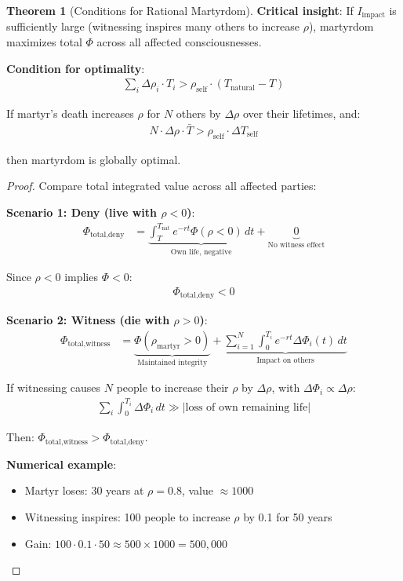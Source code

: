 \documentclass[11pt,a4paper]{article}
\theoremstyle{definition}
\newtheorem{theorem}{Theorem}[section]
\theoremstyle{remark}
\begin{document}
\begin{enumerate}
\begin{theorem}[Conditions for Rational Martyrdom]
\textbf{Critical insight}: If \(I_{\text{impact}}\) is sufficiently large (witnessing inspires many others to increase \(\rho\)), martyrdom maximizes total \(\Phi\) across all affected consciousnesses.

\textbf{Condition for optimality}:
\begin{align}
\sum_i \Delta \rho_i \cdot T_i > \rho_{\text{self}} \cdot (T_{\text{natural}} - T)
\end{align}

If martyr's death increases \(\rho\) for \(N\) others by \(\Delta \rho\) over their lifetimes, and:
\begin{align}
N \cdot \Delta \rho \cdot \bar{T} > \rho_{\text{self}} \cdot \Delta T_{\text{self}}
\end{align}

then martyrdom is globally optimal.
\end{theorem}

\begin{proof}
Compare total integrated value across all affected parties:

\textbf{Scenario 1: Deny (live with \(\rho < 0\))}:
\begin{align}
\Phi_{\text{total,deny}} &= \underbrace{\int_T^{T_{\text{nat}}} e^{-rt} \Phi(\rho < 0) \, dt}_{\text{Own life, negative}} + \underbrace{0}_{\text{No witness effect}}
\end{align}

Since \(\rho < 0\) implies \(\Phi < 0\):
\begin{align}
\Phi_{\text{total,deny}} < 0
\end{align}

\textbf{Scenario 2: Witness (die with \(\rho > 0\))}:
\begin{align}
\Phi_{\text{total,witness}} &= \underbrace{\Phi(\rho_{\text{martyr}} > 0)}_{\text{Maintained integrity}} + \underbrace{\sum_{i=1}^N \int_0^{T_i} e^{-rt} \Delta \Phi_i(t) \, dt}_{\text{Impact on others}}
\end{align}

If witnessing causes \(N\) people to increase their \(\rho\) by \(\Delta \rho\), with \(\Delta \Phi_i \propto \Delta \rho\):
\begin{align}
\sum_i \int_0^{T_i} \Delta \Phi_i \, dt \gg |\text{loss of own remaining life}|
\end{align}

Then: \(\Phi_{\text{total,witness}} > \Phi_{\text{total,deny}}\).

\textbf{Numerical example}:
\begin{itemize}
    \item Martyr loses: 30 years at \(\rho = 0.8\), value \(\approx 1000\)
    \item Witnessing inspires: 100 people to increase \(\rho\) by 0.1 for 50 years
    \item Gain: \(100 \cdot 0.1 \cdot 50 \approx 500 \times 1000 = 500{,}000\)
\end{itemize}


\end{proof}
\end{enumerate}
\end{document}
